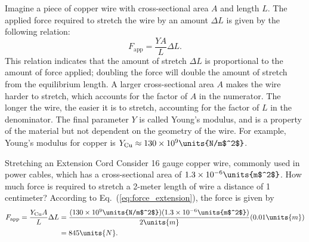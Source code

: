 Imagine a piece of copper wire with cross-sectional area $A$ and
length $L$.  The applied force required to stretch the wire by an amount
$\Delta L$ is given by the following relation:
\begin{equation}
F_\text{app} = \frac{Y A}{L}\Delta L.
\label{eq:force_extension}
\end{equation}
This relation indicates that the amount of stretch $\Delta L$ is
proportional to the amount of force applied; doubling the force will
double the amount of stretch from the equilibrium length.  A larger
cross-sectional area $A$ makes the wire harder to stretch, which
accounts for the factor of $A$ in the numerator.  The longer the wire,
the easier it is to stretch, accounting for the factor of $L$ in the
denominator.  The final parameter $Y$ is called Young's modulus,
and is a property of the material but not dependent on the geometry
of the wire.  For example, Young's modulus for copper is
$Y_{\rm Cu} \approx 130\times 10^9 \units{N/m$^2$}$.  

\begin{example}{Stretching an Extension Cord}
Consider 16 gauge copper wire, commonly used in power cables, which 
has a
cross-sectional area of $1.3\times 10^{-6}\units{m$^2$}$.  How much
force is required to stretch a 2-meter length of wire a distance of
1 centimeter?
\solution
According to Eq.~(\ref{eq:force_extension}), the force is given by
\begin{align}
 F_\text{app} = \frac{Y_{\rm Cu}A}{L}\Delta L &=
 \displaystyle\frac{(130\times 10^9\units{N/m$^2$})(1.3\times
  10^{-6}\units{m$^2$})} {2\units{m}} (0.01\units{m}) \nonumber\\
 &= 845\units{N}.
\end{align}
\end{example} 

